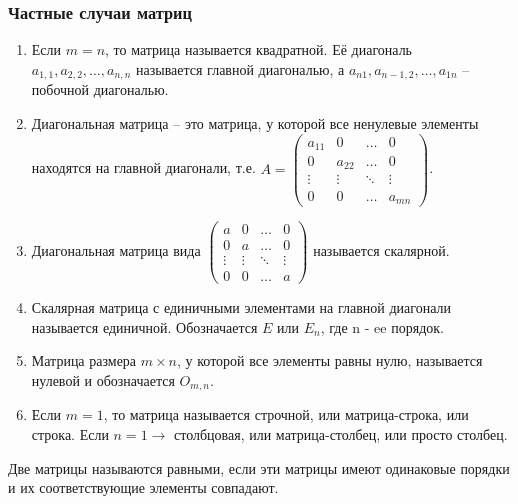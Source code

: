 \subsubsection{Частные случаи матриц}
\begin{enumerate}
  \item Если $m = n$, то матрица называется квадратной.
    Её диагональ $a_{1,1}, a_{2,2}, \dots, a_{n,n}$ называется главной диагональю, а $a_{n1}, a_{n-1,2}, \dots, a_{1n}$ – побочной диагональю.
  \item Диагональная матрица – это матрица, у которой все ненулевые элементы находятся на главной диагонали, т.е.
    $A = \left( \begin{array}{cccc}
      a_{11}& 0 &\ldots & 0\\
      0& a_{22} &\ldots & 0\\
      \vdots& \vdots &\ddots & \vdots\\
      0& 0 &\ldots & a_{mn}
    \end{array} \right)$.
  \item Диагональная матрица вида
    $\left( \begin{array}{cccc}
      a& 0 &\ldots & 0\\
      0& a &\ldots & 0\\
      \vdots& \vdots &\ddots & \vdots\\
      0& 0 &\ldots & a
    \end{array} \right)$ называется скалярной.
  \item Скалярная матрица с единичными элементами на главной диагонали называется единичной.
    Обозначается $E$ или $E_{n}$, где n - ee порядок.
  \item Матрица размера $m \times n$, у которой все элементы равны нулю, называется нулевой и обозначается $O_{m,n}$.
  \item Если $m = 1$, то матрица называется строчной, или матрица-строка, или строка.
    Если $n = 1 \rightarrow$ столбцовая, или матрица-столбец, или просто столбец.
\end{enumerate}
\begin{definition}
  Две матрицы называются равными, если эти матрицы имеют одинаковые порядки и их соответствующие элементы совпадают.
\end{definition}
